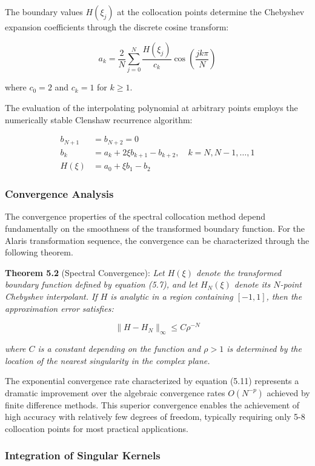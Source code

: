 \documentclass[
  11pt,
  11pt,
  letterpaper,
  onecolumn]{article}
\begin{document}
The boundary values \(H(\xi_j)\) at the collocation points determine the
Chebyshev expansion coefficients through the discrete cosine transform:

\[a_k = \frac{2}{N} \sum_{j=0}^{N} \frac{H(\xi_j)}{c_k} \cos\left(\frac{jk\pi}{N}\right) \tag{5.9}\]

where \(c_0 = 2\) and \(c_k = 1\) for \(k \geq 1\).

The evaluation of the interpolating polynomial at arbitrary points
employs the numerically stable Clenshaw recurrence algorithm:

\[\begin{aligned}
b_{N+1} &= b_{N+2} = 0 \\
b_k &= a_k + 2\xi b_{k+1} - b_{k+2}, \quad k = N, N-1, \ldots, 1 \\
H(\xi) &= a_0 + \xi b_1 - b_2
\end{aligned} \tag{5.10}\]

\subsubsection{Convergence Analysis}\label{convergence-analysis}

The convergence properties of the spectral collocation method depend
fundamentally on the smoothness of the transformed boundary function.
For the Alaris transformation sequence, the convergence can be
characterized through the following theorem.

\textbf{Theorem 5.2} (Spectral Convergence): \emph{Let \(H(\xi)\) denote
the transformed boundary function defined by equation (5.7), and let
\(H_N(\xi)\) denote its \(N\)-point Chebyshev interpolant. If \(H\) is
analytic in a region containing \([-1,1]\), then the approximation error
satisfies:}

\[\|H - H_N\|_{\infty} \leq C \rho^{-N} \tag{5.11}\]

\emph{where \(C\) is a constant depending on the function and
\(\rho > 1\) is determined by the location of the nearest singularity in
the complex plane.}

The exponential convergence rate characterized by equation (5.11)
represents a dramatic improvement over the algebraic convergence rates
\(O(N^{-p})\) achieved by finite difference methods. This superior
convergence enables the achievement of high accuracy with relatively few
degrees of freedom, typically requiring only 5-8 collocation points for
most practical applications.

\subsubsection{Integration of Singular
Kernels}\label{integration-of-singular-kernels}
\end{document}

